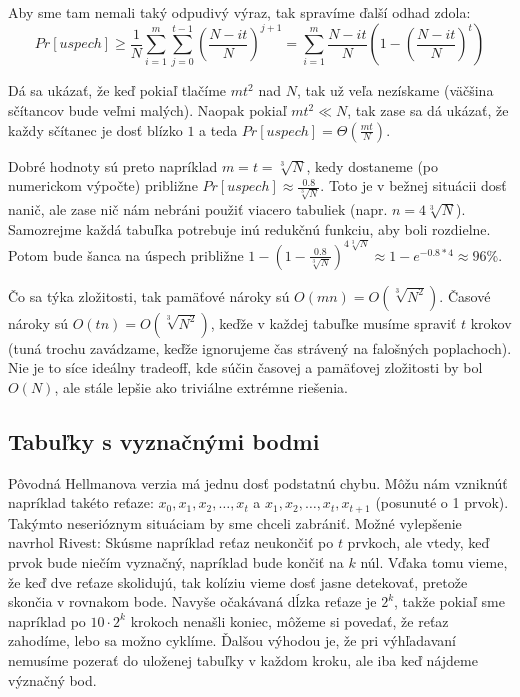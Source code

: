 Aby sme tam nemali taký odpudivý výraz,
tak spravíme ďalší odhad zdola:
\begin{equation*}
    Pr[uspech] \geq \frac{1}{N}
        \sum_{i=1}^m \sum_{j=0}^{t-1} \left ( \frac{N - it}{N} \right )^{j+1}
        =
        \sum_{i=1}^m  \frac{N-i t}{N} \left(1 -
        \left(\frac{N-it}{N}\right)^t\right)
\end{equation*}

Dá sa ukázať, že keď pokiaľ tlačíme $mt^2$ nad $N$, tak už veľa nezískame
(väčšina sčítancov bude veľmi malých).
Naopak pokiaľ $mt^2 \ll N$, tak zase sa dá ukázať,
že každy sčítanec je dosť blízko $1$ a teda 
$Pr[uspech] = \Theta\left(\frac{mt}{N}\right)$.

Dobré hodnoty sú preto napríklad $m=t=\sqrt[3]{N}$,
kedy dostaneme (po numerickom výpočte) približne 
$Pr[uspech] \approx \frac{0.8}{\sqrt[3]{N}}$.
Toto je v bežnej situácii dosť nanič, ale zase nič nám nebráni
použiť viacero tabuliek (napr. $n = 4 \sqrt[3]{N}$). 
Samozrejme každá tabuľka potrebuje inú redukčnú funkciu, aby boli
rozdielne.
Potom bude šanca na úspech približne
$1 - (1 - \frac{0.8}{\sqrt[3]{N}})^{4 \sqrt[3]{N}} 
  \approx 1-e^{-0.8*4} \approx 96\%$.

Čo sa týka zložitosti, tak pamäťové nároky sú $O(mn) = O(\sqrt[3]{N^2})$.
Časové nároky sú $O(tn) = O(\sqrt[3]{N^2})$,
keďže v každej tabuľke musíme spraviť $t$ krokov 
(tuná trochu zavádzame, keďže ignorujeme čas strávený na falošných poplachoch).
Nie je to síce ideálny tradeoff, kde súčin časovej a pamäťovej zložitosti 
by bol $O(N)$, ale stále lepšie ako triviálne extrémne riešenia.

\subsection{Tabuľky s vyznačnými bodmi}

Pôvodná Hellmanova verzia má jednu dosť podstatnú chybu.
Môžu nám vzniknúť napríklad takéto reťaze:
$x_0, x_1, x_2, \dots, x_t$ a $x_1, x_2, \dots, x_t, x_{t+1}$ 
(posunuté o 1 prvok). 
Takýmto neserióznym situáciam by sme chceli zabrániť.
Možné vylepšenie navrhol Rivest:
Skúsme napríklad reťaz neukončiť po $t$ prvkoch,
ale vtedy, keď prvok bude niečím vyznačný, napríklad bude končiť na
$k$ núl.
Vďaka tomu vieme, že keď dve reťaze skolidujú,
tak kolíziu vieme dosť jasne detekovať, pretože skončia v rovnakom bode.
Navyše očakávaná dĺzka reťaze je $2^k$,
takže pokiaľ sme napríklad po $10 \cdot 2^k$ krokoch nenašli koniec,
môžeme si povedať, že reťaz zahodíme, lebo sa možno cyklíme.
Ďalšou výhodou je, že pri výhľadavaní nemusíme pozerať do uloženej tabuľky
v každom kroku, ale iba keď nájdeme význačný bod.

